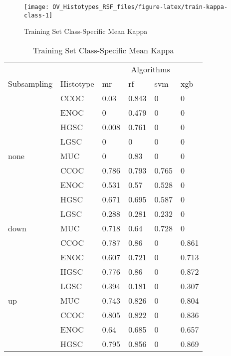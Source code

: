 \documentclass[
]{report}
\begin{document}
\begin{figure}[H]

{\centering \texttt{[image: OV\_Histotypes\_RSF\_files/figure-latex/train-kappa-class-1]} 

}

\caption{Training Set Class-Specific Mean Kappa}\label{fig:train-kappa-class}
\end{figure}

\begin{table}

\caption{\label{tab:train-kappa-class-table}Training Set Class-Specific Mean Kappa}
\centering
\begin{tabular}[t]{l|l|l|l|l|l}
\hline
\multicolumn{2}{c|}{ } & \multicolumn{4}{c}{Algorithms} \\
\cline{3-6}
Subsampling & Histotype & mr & rf & svm & xgb\\
\hline
 & CCOC & 0.03 & 0.843 & 0 & 0\\
\cline{2-6}
 & ENOC & 0 & 0.479 & 0 & 0\\
\cline{2-6}
 & HGSC & 0.008 & 0.761 & 0 & 0\\
\cline{2-6}
 & LGSC & 0 & 0 & 0 & 0\\
\cline{2-6}
\multirow{-5}{*}{\raggedright\arraybackslash none} & MUC & 0 & 0.83 & 0 & 0\\
\cline{1-6}
 & CCOC & 0.786 & 0.793 & 0.765 & 0\\
\cline{2-6}
 & ENOC & 0.531 & 0.57 & 0.528 & 0\\
\cline{2-6}
 & HGSC & 0.671 & 0.695 & 0.587 & 0\\
\cline{2-6}
 & LGSC & 0.288 & 0.281 & 0.232 & 0\\
\cline{2-6}
\multirow{-5}{*}{\raggedright\arraybackslash down} & MUC & 0.718 & 0.64 & 0.728 & 0\\
\cline{1-6}
 & CCOC & 0.787 & 0.86 & 0 & 0.861\\
\cline{2-6}
 & ENOC & 0.607 & 0.721 & 0 & 0.713\\
\cline{2-6}
 & HGSC & 0.776 & 0.86 & 0 & 0.872\\
\cline{2-6}
 & LGSC & 0.394 & 0.181 & 0 & 0.307\\
\cline{2-6}
\multirow{-5}{*}{\raggedright\arraybackslash up} & MUC & 0.743 & 0.826 & 0 & 0.804\\
\cline{1-6}
 & CCOC & 0.805 & 0.822 & 0 & 0.836\\
\cline{2-6}
 & ENOC & 0.64 & 0.685 & 0 & 0.657\\
\cline{2-6}
 & HGSC & 0.795 & 0.856 & 0 & 0.869\\

\end{tabular}
\end{table}
\end{document}
